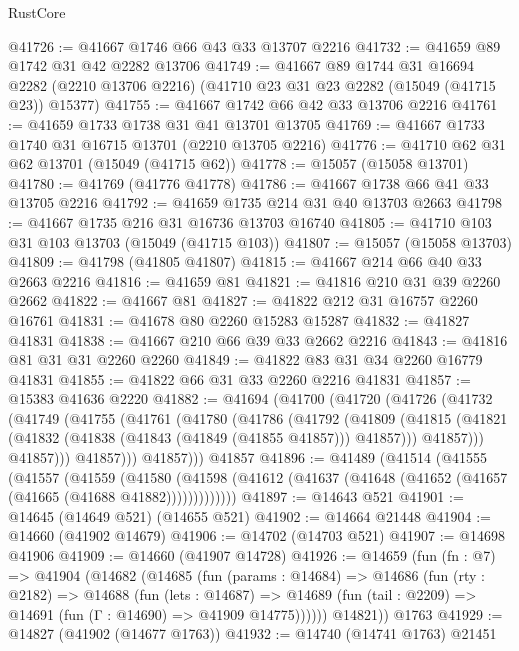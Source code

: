 \begin{lexlean}{RustCore}
\begin{coremodule}
@41726 := @41667 @1746 @66 @43 @33 @13707 @2216
@41732 := @41659 @89 @1742 @31 @42 @2282 @13706
@41749 := @41667
    @89
    @1744
    @31
    @16694
    @2282
    (@2210 @13706 @2216)
    (@41710 @23 @31 @23 @2282 (@15049 (@41715 @23)) @15377)
@41755 := @41667 @1742 @66 @42 @33 @13706 @2216
@41761 := @41659 @1733 @1738 @31 @41 @13701 @13705
@41769 := @41667 @1733 @1740 @31 @16715 @13701 (@2210 @13705 @2216)
@41776 := @41710 @62 @31 @62 @13701 (@15049 (@41715 @62))
@41778 := @15057 (@15058 @13701)
@41780 := @41769 (@41776 @41778)
@41786 := @41667 @1738 @66 @41 @33 @13705 @2216
@41792 := @41659 @1735 @214 @31 @40 @13703 @2663
@41798 := @41667 @1735 @216 @31 @16736 @13703 @16740
@41805 := @41710 @103 @31 @103 @13703 (@15049 (@41715 @103))
@41807 := @15057 (@15058 @13703)
@41809 := @41798 (@41805 @41807)
@41815 := @41667 @214 @66 @40 @33 @2663 @2216
@41816 := @41659 @81
@41821 := @41816 @210 @31 @39 @2260 @2662
@41822 := @41667 @81
@41827 := @41822 @212 @31 @16757 @2260 @16761
@41831 := @41678 @80 @2260 @15283 @15287
@41832 := @41827 @41831
@41838 := @41667 @210 @66 @39 @33 @2662 @2216
@41843 := @41816 @81 @31 @31 @2260 @2260
@41849 := @41822 @83 @31 @34 @2260 @16779 @41831
@41855 := @41822 @66 @31 @33 @2260 @2216 @41831
@41857 := @15383 @41636 @2220
@41882 := @41694
    (@41700
      (@41720
        (@41726
          (@41732
            (@41749
              (@41755
                (@41761
                  (@41780
                    (@41786
                      (@41792
                        (@41809
                          (@41815
                            (@41821 (@41832 (@41838 (@41843 (@41849 (@41855 @41857))) @41857)))
                            @41857)))
                      @41857)))
                @41857)))
          @41857)))
    @41857
@41896 := @41489
    (@41514
      (@41555
        (@41557
          (@41559
            (@41580
              (@41598 (@41612 (@41637 (@41648 (@41652 (@41657 (@41665 (@41688 @41882)))))))))))))
@41897 := @14643 @521
@41901 := @14645 (@14649 @521) (@14655 @521)
@41902 := @14664 @21448
@41904 := @14660 (@41902 @14679)
@41906 := @14702 (@14703 @521)
@41907 := @14698 @41906
@41909 := @14660 (@41907 @14728)
@41926 := @14659
    (fun (fn : @7) =>
    @41904
      (@14682
        (@14685
          (fun (params : @14684) =>
          @14686
            (fun (rty : @2182) =>
            @14688
              (fun (lets : @14687) =>
              @14689 (fun (tail : @2209) => @14691 (fun (Γ : @14690) => @41909 @14775))))))
        @14821))
    @1763
@41929 := @14827 (@41902 (@14677 @1763))
@41932 := @14740 (@14741 @1763) @21451

\end{coremodule}
\end{lexlean}
